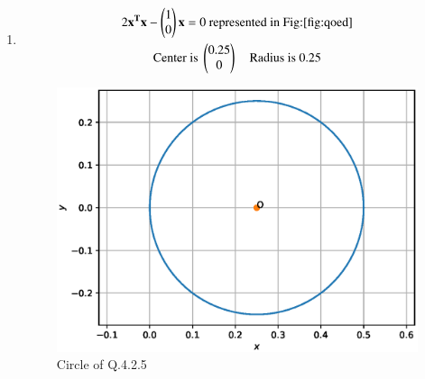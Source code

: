 \begin{enumerate}[label=\thesection.\arabic*.,ref=\thesection.\theenumi]
\begin{enumerate}

\item \begin{multline} 
2\mathbf{x^Tx} - \begin{pmatrix}1\\0\end{pmatrix}\mathbf{x} = 0\text{ represented in Fig:\ref{fig:qoed}}
\\
\text{Center is }\begin{pmatrix}0.25\\0\end{pmatrix}\quad\text{Radius is }0.25
\end{multline}
	\begin{figure}[!ht]
	\centering
	\includegraphics[width=\columnwidth]{./figs/circle/q18d.eps}
	\caption{Circle of Q.4.2.5}
	\label{fig:qoed}	
	\end{figure}



\end{enumerate}
\end{enumerate}
